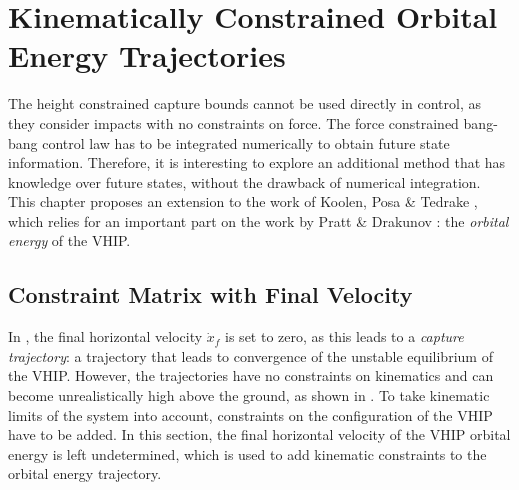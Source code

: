 %
\chapter{Kinematically Constrained Orbital Energy Trajectories}\label{chap:mpc}
The height constrained capture bounds cannot be used directly in control, as they consider impacts with no constraints on force. The force constrained bang-bang control law has to be integrated numerically to obtain future state information. Therefore, it is interesting to explore an additional method that has knowledge over future states, without the drawback of numerical integration. This chapter proposes an extension to the work of Koolen, Posa \& Tedrake \cite{koolen2016balance}, which relies for an important part on the work by Pratt \& Drakunov \cite{pratt2007derivation}: the \textit{orbital energy} of the \ac{VHIP}.

\section{Constraint Matrix with Final Velocity}
In \cite{koolen2016balance}, the final horizontal velocity $\dot{x}_f$ is set to zero, as this leads to a \textit{capture trajectory}: a trajectory that leads to convergence of the unstable equilibrium of the \ac{VHIP}. However, the trajectories have no constraints on kinematics and can become unrealistically high above the ground, as shown in . To take kinematic limits of the system into account, constraints on the configuration of the \ac{VHIP} have to be added. In this section, the final horizontal velocity of the \ac{VHIP} orbital energy is left undetermined, which is used to add kinematic constraints to the orbital energy trajectory.

